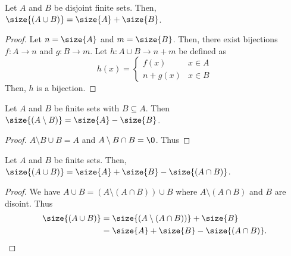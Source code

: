 \begin{lemma} \label{thm:cardinality:disjoint_union}
    Let $A$ and $B$ be disjoint finite sets.
    Then, $\size{(A \cup B)} = \size{A} + \size{B}$.
\end{lemma}
\begin{proof}
    Let $n = \size{A}$ and $m = \size{B}$.
    Then, there exist bijections $f : A \to n$ and $g : B \to m$.
    Let $h : A \cup B \to n + m$ be defined as \[
        h(x) = \begin{cases}
            f(x) & x \in A \\
            n + g(x) & x \in B
        \end{cases}
    \] Then, $h$ is a bijection.
\end{proof}

\begin{corollary}[Difference] \label{thm:cardinality:difference}
    Let $A$ and $B$ be finite sets with $B \subseteq A$.
    Then $\size{(A \setminus B)} = \size{A} - \size{B}$.
\end{corollary}
\begin{proof}
    $A \setminus B \cup B = A$ and $A \setminus B \cap B = \O$.
    Thus 
\end{proof}
\begin{theorem}[Union] \label{thm:cardinality:union}
    Let $A$ and $B$ be finite sets.
    Then, $\size{(A \cup B)} = \size{A} + \size{B} - \size{(A \cap B)}$.
\end{theorem}
\begin{proof}
    We have $A \cup B = (A \setminus (A \cap B)) \cup B$ where
    $A \setminus (A \cap B)$ and $B$ are disoint.
    Thus
    \begin{align*}
        \size{(A \cup B)} &= \size{(A \setminus (A \cap B))} + \size{B} \\
        &= \size{A} + \size{B} - \size{(A \cap B)}. \qedhere
    \end{align*}
\end{proof}

